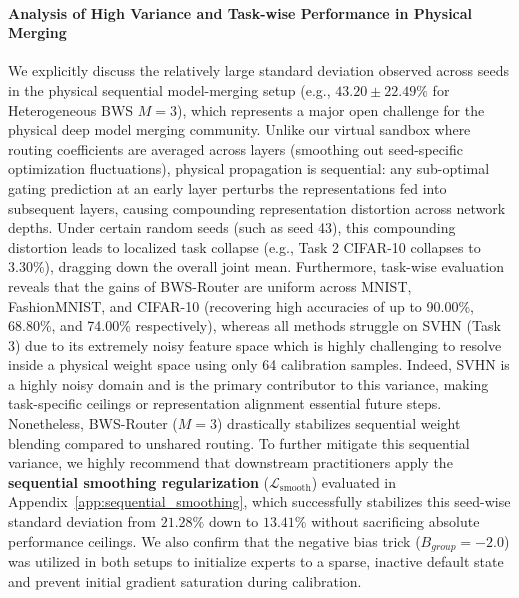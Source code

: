 \paragraph{Analysis of High Variance and Task-wise Performance in Physical Merging}
We explicitly discuss the relatively large standard deviation observed across seeds in the physical sequential model-merging setup (e.g., $43.20 \pm 22.49\%$ for Heterogeneous BWS $M=3$), which represents a major open challenge for the physical deep model merging community. Unlike our virtual sandbox where routing coefficients are averaged across layers (smoothing out seed-specific optimization fluctuations), physical propagation is sequential: any sub-optimal gating prediction at an early layer perturbs the representations fed into subsequent layers, causing compounding representation distortion across network depths. Under certain random seeds (such as seed 43), this compounding distortion leads to localized task collapse (e.g., Task 2 CIFAR-10 collapses to 3.30\%), dragging down the overall joint mean. Furthermore, task-wise evaluation reveals that the gains of BWS-Router are uniform across MNIST, FashionMNIST, and CIFAR-10 (recovering high accuracies of up to 90.00\%, 68.80\%, and 74.00\% respectively), whereas all methods struggle on SVHN (Task 3) due to its extremely noisy feature space which is highly challenging to resolve inside a physical weight space using only 64 calibration samples. Indeed, SVHN is a highly noisy domain and is the primary contributor to this variance, making task-specific ceilings or representation alignment essential future steps. Nonetheless, BWS-Router ($M=3$) drastically stabilizes sequential weight blending compared to unshared routing. To further mitigate this sequential variance, we highly recommend that downstream practitioners apply the \textbf{sequential smoothing regularization} ($\mathcal{L}_{\text{smooth}}$) evaluated in Appendix~\ref{app:sequential_smoothing}, which successfully stabilizes this seed-wise standard deviation from $21.28\%$ down to $13.41\%$ without sacrificing absolute performance ceilings. We also confirm that the negative bias trick ($B_{group} = -2.0$) was utilized in both setups to initialize experts to a sparse, inactive default state and prevent initial gradient saturation during calibration.


